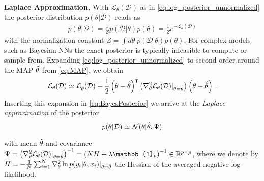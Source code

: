 \textbf{Laplace Approximation.} With $\mathcal{L}_\theta(\mathcal{D})$ as in \eqref{eq:log_posterior_unnormalized} the posterior distribution $p(\theta|\mathcal{D})$ reads as
\begin{align}
\label{eq:BayesPosterior}
    p(\theta| \mathcal{D}) = \frac{1}{Z} p(\mathcal{D} | \theta) p(\theta)
    = \frac{1}{Z} e^{-\mathcal{L}_{\theta}(\mathcal{D})}
\end{align}
with the normalization constant $Z=\int d\theta\; p(\mathcal{D} | \theta) p(\theta)$. 
For complex models such as Bayesian NNs the exact posterior is typically infeasible to compute or sample from. Expanding \eqref{eq:log_posterior_unnormalized} to second order around the MAP $\hat{\theta}$ from \eqref{eq:MAP}, we obtain 
\[
    \mathcal{L}_{\theta}(\mathcal{D}) \simeq
    \mathcal{L}_{\hat{\theta}}(\mathcal{D}) 
    + \frac{1}{2} \left(\theta - \hat{\theta}\right)^\intercal
    \left(\nabla_{\theta}^2 \mathcal{L}_{\theta}(\mathcal{D})\vert_{\theta=\hat{\theta}}\right)
    \left(\theta - \hat{\theta}\right) \,.
\]
Inserting this expansion in \eqref{eq:BayesPosterior} we arrive at the \emph{Laplace approximation} of the posterior 
\[
p(\theta| \mathcal{D}) \simeq \mathcal{N}(\theta | \hat{\theta}, \Psi)
\]

with mean $\hat{\theta}$ and covariance $\Psi = \left(\nabla_{\theta}^2 \mathcal{L}_{\theta}(\mathcal{D}) \vert_{\theta=\map{\theta}}\right)^{-1} = \left( N H + \lambda\mathbb{1}_p  \right)^{-1} \in \mathbb{R}^{p\times p}$, where we denote by $H=-\frac{1}{N}\sum_{i=1}^N\nabla_\theta^2 \ln p(y_i|\theta,x_i)\vert_{\theta=\hat{\theta}}$ the Hessian of the averaged negative log-likelihood.



